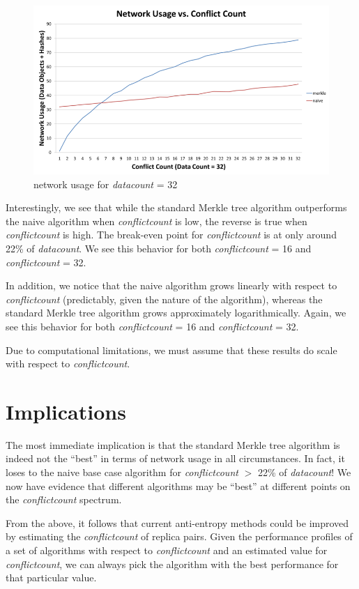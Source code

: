 \documentclass[11pt,letterpaper]{article}
\begin{document}
\begin{figure}[hbtp]
\caption{network usage for \textit{datacount} = 32}
\centering
\includegraphics[scale=0.7]{results32.png} 
\end{figure}

Interestingly, we see that while the standard Merkle tree algorithm outperforms the naive algorithm when \textit{conflictcount} is low, the reverse is true when \textit{conflictcount} is high. The break-even point for \textit{conflictcount} is at only around 22\% of \textit{datacount}. We see this behavior for both \textit{conflictcount} = 16 and \textit{conflictcount} = 32.

In addition, we notice that the naive algorithm grows linearly with respect to \textit{conflictcount} (predictably, given the nature of the algorithm), whereas the standard Merkle tree algorithm grows approximately logarithmically. Again, we see this behavior for both \textit{conflictcount} = 16 and \textit{conflictcount} = 32.

Due to computational limitations, we must assume that these results do scale with respect to \textit{conflictcount}.

\section{Implications}
The most immediate implication is that the standard Merkle tree algorithm is indeed not the ``best'' in terms of network usage in all circumstances. In fact, it loses to the naive base case algorithm for \textit{conflictcount} $ > $ 22\% of \textit{datacount}! We now have evidence that different algorithms may be ``best'' at different points on the \textit{conflictcount} spectrum.

From the above, it follows that current anti-entropy methods could be improved by estimating the \textit{conflictcount} of replica pairs. Given the performance profiles of a set of algorithms with respect to \textit{conflictcount} and an estimated value for \textit{conflictcount}, we can always pick the algorithm with the best performance for that particular value.
\end{document}
